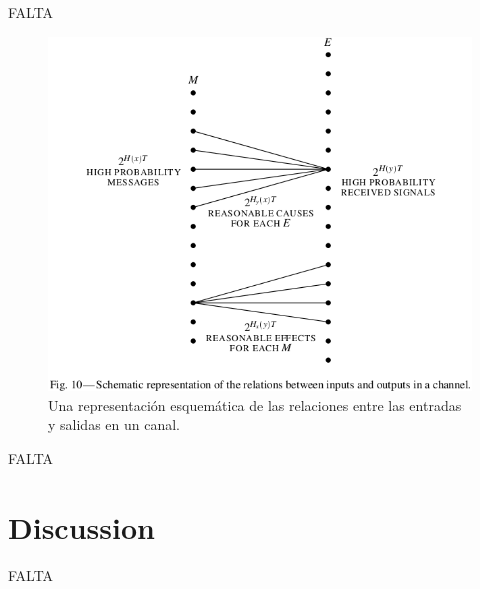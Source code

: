 FALTA

\begin{figure}[!ht]
\centerline{\includegraphics[width=140mm]{Imagenes/Pagina23-Figura10.png}}
\caption{Una representaci\'{o}n esquem\'{a}tica de las relaciones
  entre las entradas y salidas en un canal.}
\label{fig:10}
\end{figure}

FALTA

\clearpage

\chapter{Discussion}
\label{sec:14}

FALTA

